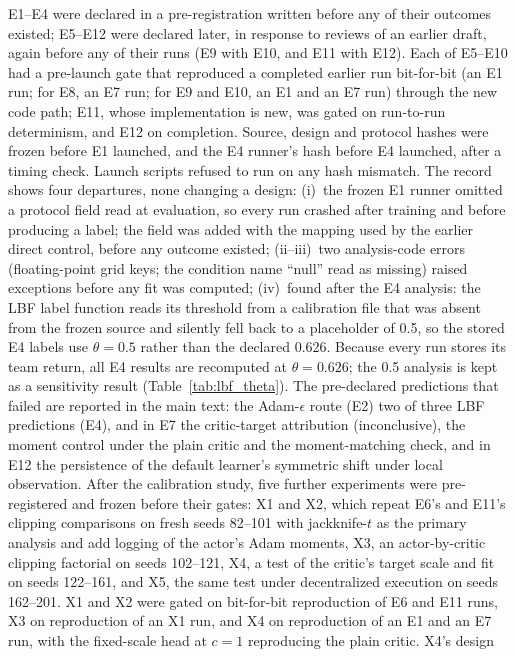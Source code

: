 E1--E4 were declared in a pre-registration written before any of their outcomes existed; E5--E12 were
declared later, in response to reviews of an earlier draft, again before any of their runs (E9 with E10, and E11
with E12). Each of E5--E10 had a pre-launch gate that reproduced a completed earlier run bit-for-bit (an E1 run; for E8, an E7 run; for E9 and E10, an E1 and an E7 run) through the new code path; E11, whose implementation is new, was gated on run-to-run determinism, and E12 on completion. Source,
design and protocol hashes were frozen before E1 launched, and the E4 runner's hash before E4 launched,
after a timing check. Launch scripts refused to run on any hash mismatch. The record shows four
departures, none changing a design:
(i)~the frozen E1 runner omitted a protocol field read at evaluation, so every run crashed after training
and before producing a label; the field was added with the mapping used by the earlier direct control,
before any outcome existed;
(ii--iii)~two analysis-code errors (floating-point grid keys; the condition name ``null'' read as missing)
raised exceptions before any fit was computed;
(iv)~found after the E4 analysis: the LBF label function reads its threshold from a calibration file that was
absent from the frozen source and silently fell back to a placeholder of 0.5, so the stored E4 labels use
$\theta=0.5$ rather than the declared 0.626. Because every run stores its team return, all E4 results are
recomputed at $\theta=0.626$; the 0.5 analysis is kept as a sensitivity result (Table~\ref{tab:lbf_theta}).
The pre-declared predictions that failed are reported in the main text: the Adam-$\epsilon$ route (E2)
two of three LBF predictions (E4), and in E7 the critic-target attribution (inconclusive), the moment
control under the plain critic and the moment-matching check, and in E12 the persistence of the default learner's symmetric shift under local observation. After the calibration
study, five further experiments were pre-registered and frozen before their gates: X1 and X2, which repeat E6's and
E11's clipping comparisons on fresh seeds 82--101 with jackknife-$t$ as the primary analysis and add logging of the
actor's Adam moments, X3, an actor-by-critic clipping factorial on seeds 102--121, X4, a test of the critic's target scale and fit on
seeds 122--161, and X5, the same test under decentralized execution on seeds 162--201. X1 and X2 were gated on bit-for-bit reproduction of E6 and E11 runs, X3 on reproduction of an X1 run,
and X4 on reproduction of an E1 and an E7 run, with the fixed-scale head at $c=1$ reproducing the plain critic. X4's design
